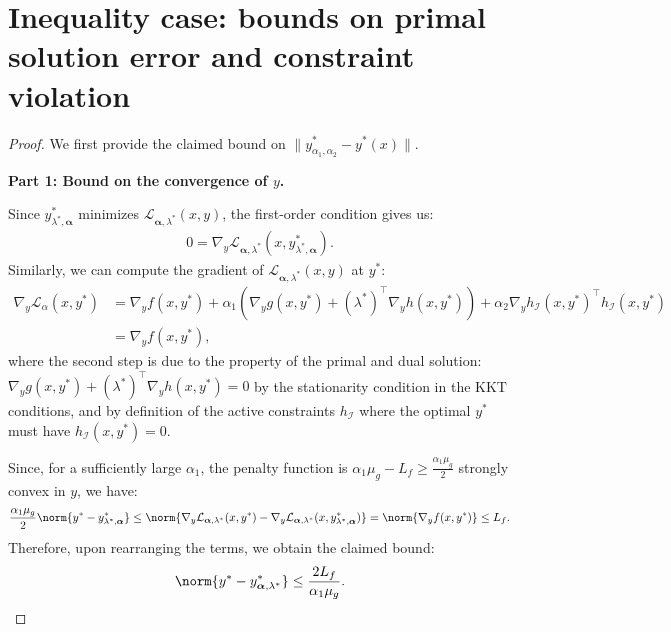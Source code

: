 \section{Inequality case: bounds on primal solution error and constraint violation}
\solutionApproximation*

\begin{proof}
We first provide the claimed bound on $\|y^*_{\alpha_1, \alpha_2} - y^*(x)\|$. 

\noindent\textbf{Part 1: Bound on the convergence of $y$.}

Since $y_{\lambda^*,\boldsymbol{\alpha}}^*$ minimizes $\mathcal{L}_{\boldsymbol{\alpha}, \lambda^*}(x,y)$, the first-order condition gives us:
\begin{align*}
    0 = \nabla_y \mathcal{L}_{\boldsymbol{\alpha}, \lambda^*}(x,y_{\lambda^*,\boldsymbol{\alpha}}^*). 
\end{align*}
Similarly, we can compute the gradient of $\mathcal{L}_{\boldsymbol{\alpha}, \lambda^*}(x,y)$ at $y^*$: 
\begin{align*}
    \nabla_y \mathcal{L}_{\alpha}(x,y^*) & = \nabla_y f(x,y^*) + \alpha_1(\nabla_y g(x,y^*) + (\lambda^*)^\top \nabla_y h(x,y^*)) + \alpha_2 \nabla_y h_\mathcal{I}(x,y^*)^\top h_\mathcal{I}(x,y^*)  \\
    & = \nabla_y f(x,y^*),
\end{align*} 
where the second step is due to the property of the primal and dual solution: $\nabla_y g(x,y^*) + (\lambda^*)^\top \nabla_y h(x,y^*) = 0$ by the stationarity condition in the KKT conditions, and by definition of the active constraints $h_\mathcal{I}$ where the optimal $y^*$ must have $h_\mathcal{I}(x,y^*) = 0$.

Since, for a sufficiently large $\alpha_1$, the penalty function is $\alpha_1 \mu_g - L_f \geq \frac{\alpha_1 \mu_g}{2}$  strongly convex in $y$, we have:
\begin{align*}
    \frac{\alpha_1 \mu_g}{2} \norm{y^* - y_{\lambda^*,\boldsymbol{\alpha}}^*} \leq \norm{\nabla_y\mathcal{L}_{\boldsymbol{\alpha}, \lambda^*}(x,y^*) - \nabla_y\mathcal{L}_{\boldsymbol{\alpha}, \lambda^*}(x,y_{\lambda^*,\boldsymbol{\alpha}}^*)} = \norm{\nabla_y f(x,y^*)} \leq L_f.
\end{align*}
Therefore, upon rearranging the terms,  we obtain the claimed bound:
\begin{align*}
    \norm{y^* - y^*_{\boldsymbol{\alpha}, \lambda^*}} \leq \frac{2 L_f}{\alpha_1 \mu_g}.
\end{align*}


\end{proof}
